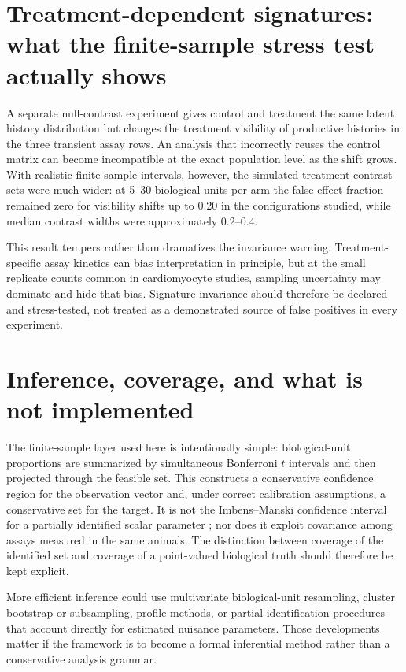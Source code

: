 \documentclass[11pt]{article}
\begin{document}
\section{Treatment-dependent signatures: what the finite-sample stress test actually shows}
A separate null-contrast experiment gives control and treatment the same latent history distribution but changes the treatment visibility of productive histories in the three transient assay rows. An analysis that incorrectly reuses the control matrix can become incompatible at the exact population level as the shift grows. With realistic finite-sample intervals, however, the simulated treatment-contrast sets were much wider: at 5--30 biological units per arm the false-effect fraction remained zero for visibility shifts up to 0.20 in the configurations studied, while median contrast widths were approximately 0.2--0.4.

This result tempers rather than dramatizes the invariance warning. Treatment-specific assay kinetics can bias interpretation in principle, but at the small replicate counts common in cardiomyocyte studies, sampling uncertainty may dominate and hide that bias. Signature invariance should therefore be declared and stress-tested, not treated as a demonstrated source of false positives in every experiment.

\section{Inference, coverage, and what is not implemented}
The finite-sample layer used here is intentionally simple: biological-unit proportions are summarized by simultaneous Bonferroni $t$ intervals and then projected through the feasible set. This constructs a conservative confidence region for the observation vector and, under correct calibration assumptions, a conservative set for the target. It is not the Imbens--Manski confidence interval for a partially identified scalar parameter \citep{ImbensManski2004}; nor does it exploit covariance among assays measured in the same animals. The distinction between coverage of the identified set and coverage of a point-valued biological truth should therefore be kept explicit.

More efficient inference could use multivariate biological-unit resampling, cluster bootstrap or subsampling, profile methods, or partial-identification procedures that account directly for estimated nuisance parameters. Those developments matter if the framework is to become a formal inferential method rather than a conservative analysis grammar.
\end{document}
